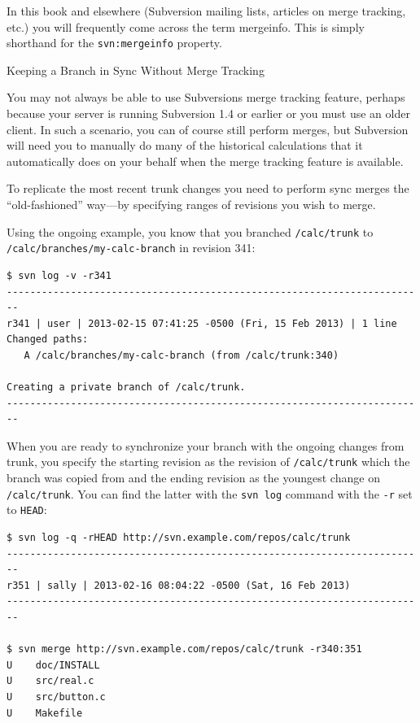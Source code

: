 In this book and elsewhere (Subversion mailing lists, articles on merge
tracking, etc.) you will frequently come across the term mergeinfo. This
is simply shorthand for the \texttt{svn:mergeinfo} property.

Keeping a Branch in Sync Without Merge Tracking

You may not always be able to use Subversion\textquotesingle s merge
tracking feature, perhaps because your server is running Subversion 1.4
or earlier or you must use an older client. In such a scenario, you can
of course still perform merges, but Subversion will need you to manually
do many of the historical calculations that it automatically does on
your behalf when the merge tracking feature is available.

To replicate the most recent trunk changes you need to perform sync
merges the ``old-fashioned'' way---by specifying ranges of revisions you
wish to merge.

Using the ongoing example, you know that you branched
\texttt{/calc/trunk} to \texttt{/calc/branches/my-calc-branch} in
revision 341:

\begin{verbatim}
$ svn log -v -r341
------------------------------------------------------------------------
r341 | user | 2013-02-15 07:41:25 -0500 (Fri, 15 Feb 2013) | 1 line
Changed paths:
   A /calc/branches/my-calc-branch (from /calc/trunk:340)

Creating a private branch of /calc/trunk.
------------------------------------------------------------------------
\end{verbatim}

When you are ready to synchronize your branch with the ongoing changes
from trunk, you specify the starting revision as the revision of
\texttt{/calc/trunk} which the branch was copied from and the ending
revision as the youngest change on \texttt{/calc/trunk}. You can find
the latter with the \texttt{svn\ log} command with the \texttt{-r} set
to \texttt{HEAD}:

\begin{verbatim}
$ svn log -q -rHEAD http://svn.example.com/repos/calc/trunk
------------------------------------------------------------------------
r351 | sally | 2013-02-16 08:04:22 -0500 (Sat, 16 Feb 2013)
------------------------------------------------------------------------

$ svn merge http://svn.example.com/repos/calc/trunk -r340:351
U    doc/INSTALL
U    src/real.c
U    src/button.c
U    Makefile
\end{verbatim}

